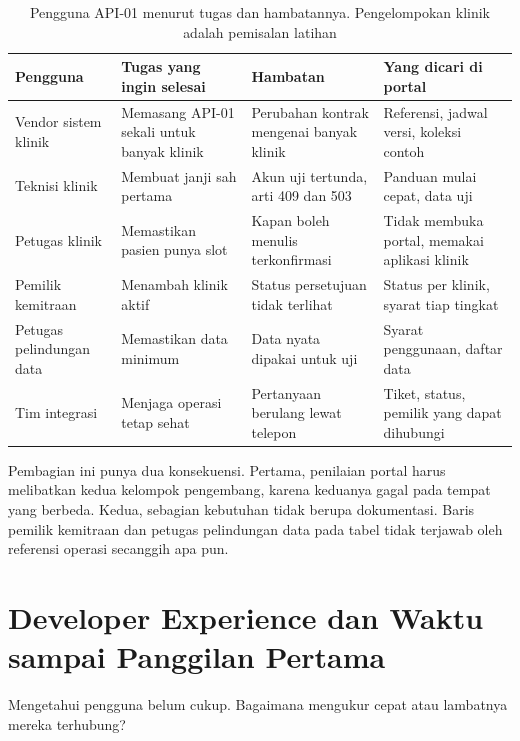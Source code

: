 \begin{table}[!htb]
  \centering
  \caption{Pengguna API-01 menurut tugas dan hambatannya. Pengelompokan klinik adalah pemisalan latihan}
  \label{tab:ch11-pengguna}
  \footnotesize
  \begin{tabularx}{\textwidth}{H{2.3cm}GGG}
    \hline
    \textbf{Pengguna} & \textbf{Tugas yang ingin selesai} & \textbf{Hambatan} & \textbf{Yang dicari di portal} \\ \hline
    Vendor sistem klinik & Memasang API-01 sekali untuk banyak klinik & Perubahan kontrak mengenai banyak klinik & Referensi, jadwal versi, koleksi contoh \\ \hline
    Teknisi klinik & Membuat janji sah pertama & Akun uji tertunda, arti 409 dan 503 & Panduan mulai cepat, data uji \\ \hline
    Petugas klinik & Memastikan pasien punya slot & Kapan boleh menulis terkonfirmasi & Tidak membuka portal, memakai aplikasi klinik \\ \hline
    Pemilik kemitraan & Menambah klinik aktif & Status persetujuan tidak terlihat & Status per klinik, syarat tiap tingkat \\ \hline
    Petugas pelindungan data & Memastikan data minimum & Data nyata dipakai untuk uji & Syarat penggunaan, daftar data \\ \hline
    Tim integrasi & Menjaga operasi tetap sehat & Pertanyaan berulang lewat telepon & Tiket, status, pemilik yang dapat dihubungi \\ \hline
  \end{tabularx}
\end{table}

Pembagian ini punya dua konsekuensi. Pertama, penilaian portal harus melibatkan kedua kelompok pengembang, karena
keduanya gagal pada tempat yang berbeda. Kedua, sebagian kebutuhan tidak berupa dokumentasi. Baris pemilik kemitraan dan
petugas pelindungan data pada tabel tidak terjawab oleh referensi operasi secanggih apa pun.

\section{Developer Experience dan Waktu sampai Panggilan Pertama}

Mengetahui pengguna belum cukup. Bagaimana mengukur cepat atau lambatnya mereka terhubung?

